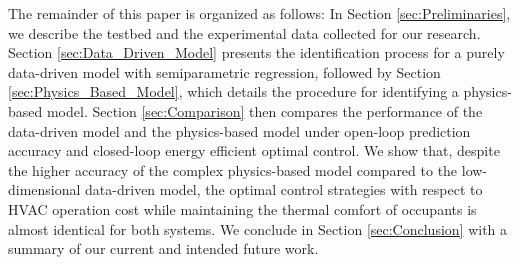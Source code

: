 The remainder of this paper is organized as follows: In Section \ref{sec:Preliminaries}, we describe the testbed and the experimental data collected for our research. Section \ref{sec:Data_Driven_Model} presents the identification process for a purely data-driven model with semiparametric regression, followed by Section \ref{sec:Physics_Based_Model}, which details the procedure for identifying a physics-based model. Section \ref{sec:Comparison} then compares the performance of the data-driven model and the physics-based model under open-loop prediction accuracy and closed-loop energy efficient optimal control. We show that, despite the higher accuracy of the complex physics-based model compared to the low-dimensional data-driven model, the optimal control strategies with respect to HVAC operation cost while maintaining the thermal comfort of occupants is almost identical for both systems. We conclude in Section \ref{sec:Conclusion} with a summary of our current and intended future work.

